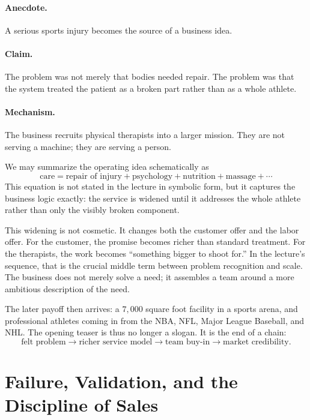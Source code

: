 \paragraph{Anecdote.}
A serious sports injury becomes the source of a business idea.

\paragraph{Claim.}
The problem was not merely that bodies needed repair. The problem was that the system treated the patient as a broken part rather than as a whole athlete.

\paragraph{Mechanism.}
The business recruits physical therapists into a larger mission. They are not serving a machine; they are serving a person.

We may summarize the operating idea schematically as
\begin{equation}
\text{care}
=
\text{repair of injury}
+
\text{psychology}
+
\text{nutrition}
+
\text{massage}
+\cdots
\end{equation}
This equation is not stated in the lecture in symbolic form, but it captures the business logic exactly: the service is widened until it addresses the whole athlete rather than only the visibly broken component.

This widening is not cosmetic. It changes both the customer offer and the labor offer. For the customer, the promise becomes richer than standard treatment. For the therapists, the work becomes ``something bigger to shoot for.'' In the lecture's sequence, that is the crucial middle term between problem recognition and scale. The business does not merely solve a need; it assembles a team around a more ambitious description of the need.

The later payoff then arrives: a $7{,}000$ square foot facility in a sports arena, and professional athletes coming in from the NBA, NFL, Major League Baseball, and NHL. The opening teaser is thus no longer a slogan. It is the end of a chain:
\[
\text{felt problem}
\longrightarrow
\text{richer service model}
\longrightarrow
\text{team buy-in}
\longrightarrow
\text{market credibility}.
\]

\section{Failure, Validation, and the Discipline of Sales}

